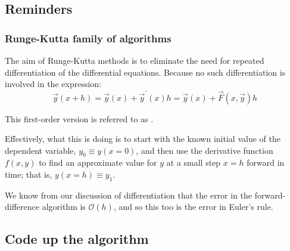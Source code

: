 \documentclass[hyperref={colorlinks=true}]{beamer}
\begin{document}
\subsection[Reminders]{Reminders}

\begin{frame}%
  \frametitle{Runge-Kutta family of algorithms}

  The aim of Runge-Kutta methods is to eliminate the need for repeated differentiation of the differential equations. Because no such differentiation is involved in the  expression:
  \begin{equation}
    \vec{y}(x + h) = \vec{y}(x) + \vec{y}^{\prime}(x)h = \vec{y}(x) + \vec{F}(x, \vec{y})h
  \end{equation}
  
  This first-order version is referred to as .
  
  \mysp
  
  Effectively, what this is doing is to start with the known initial value of the dependent variable, $y_0 \equiv y(x = 0)$, and then use the derivative function $f(x,y)$ to find an approximate value for $y$ at a small step $x = h$ forward in time; that is, $y(x = h) \equiv y_1$. 
  
  \mysp
  
  We know from our discussion of differentiation that the error in the forward-difference algorithm is $\mathcal{O}(h)$, and so this too is the error in Euler's rule.
  
    \centering \Large {}

\end{frame}

\subsection[Code up the algorithm]{Code up the algorithm}
\end{document}
